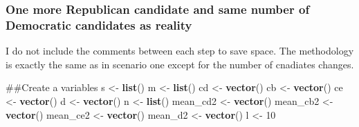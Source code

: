 \documentclass[]{article}
\newenvironment{Shaded}{\begin{snugshade}}{\end{snugshade}}
\newcommand{\KeywordTok}[1]{\textcolor[rgb]{0.13,0.29,0.53}{\textbf{#1}}}
\newcommand{\DataTypeTok}[1]{\textcolor[rgb]{0.13,0.29,0.53}{#1}}
\newcommand{\DecValTok}[1]{\textcolor[rgb]{0.00,0.00,0.81}{#1}}
\newcommand{\StringTok}[1]{\textcolor[rgb]{0.31,0.60,0.02}{#1}}
\newcommand{\ControlFlowTok}[1]{\textcolor[rgb]{0.13,0.29,0.53}{\textbf{#1}}}
\newcommand{\OperatorTok}[1]{\textcolor[rgb]{0.81,0.36,0.00}{\textbf{#1}}}
\newcommand{\NormalTok}[1]{#1}
\begin{document}
\subsubsection{One more Republican candidate and same number of
Democratic candidates as
reality}\label{one-more-republican-candidate-and-same-number-of-democratic-candidates-as-reality}

I do not include the comments between each step to save space. The
methodology is exactly the same as in scenario one except for the number
of cnadiates changes.

\begin{Shaded}
\begin{Highlighting}[]
\NormalTok{##Create a variables}
\NormalTok{s <-}\StringTok{ }\KeywordTok{list}\NormalTok{()}
\NormalTok{m <-}\StringTok{ }\KeywordTok{list}\NormalTok{()}
\NormalTok{cd <-}\StringTok{ }\KeywordTok{vector}\NormalTok{()}
\NormalTok{cb <-}\StringTok{ }\KeywordTok{vector}\NormalTok{()}
\NormalTok{ce <-}\StringTok{ }\KeywordTok{vector}\NormalTok{()}
\NormalTok{d <-}\StringTok{ }\KeywordTok{vector}\NormalTok{()}
\NormalTok{n <-}\StringTok{ }\KeywordTok{list}\NormalTok{()}
\NormalTok{mean_cd2 <-}\StringTok{ }\KeywordTok{vector}\NormalTok{()}
\NormalTok{mean_cb2 <-}\StringTok{ }\KeywordTok{vector}\NormalTok{()}
\NormalTok{mean_ce2 <-}\StringTok{ }\KeywordTok{vector}\NormalTok{()}
\NormalTok{mean_d2 <-}\StringTok{ }\KeywordTok{vector}\NormalTok{()}
\NormalTok{l <-}\StringTok{ }\DecValTok{10}
\end{Highlighting}
\end{Shaded}

\begin{Shaded}
\end{Shaded}
\end{document}
